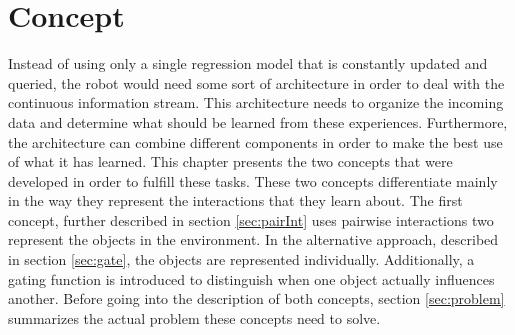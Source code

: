 \chapter{Concept \label{chap:concept}}



Instead of using only a single regression model that is constantly updated and queried, the robot would need some sort of architecture in order to deal with the continuous information stream. This architecture needs to organize the incoming data and determine what should be learned from these experiences. Furthermore, the architecture can combine different components in order to make the best use of what it has learned. This chapter presents the two concepts that were developed in order to fulfill these tasks. These two concepts differentiate mainly in the way they represent the interactions that they learn about. The first concept, further described in section \ref{sec:pairInt} uses pairwise interactions two represent the objects in the environment. In the alternative approach, described in section \ref{sec:gate}, the objects are represented individually. Additionally, a gating function is introduced to distinguish when one object actually influences another. Before going into the description of both concepts, section \ref{sec:problem} summarizes the actual problem these concepts need to solve. 

%

